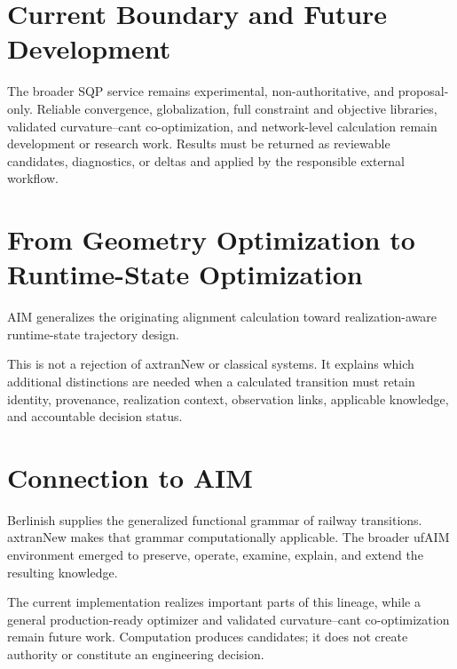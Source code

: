 \section{Current Boundary and Future Development}

The broader SQP service remains experimental, non-authoritative, and
proposal-only. Reliable convergence, globalization, full constraint and
objective libraries, validated curvature--cant co-optimization, and
network-level calculation remain development or research work. Results must be
returned as reviewable candidates, diagnostics, or deltas and applied by the
responsible external workflow.

\section{From Geometry Optimization to Runtime-State Optimization}

AIM generalizes the originating alignment calculation toward
realization-aware runtime-state trajectory design.

This is not a rejection of axtranNew or classical systems. It explains which
additional distinctions are needed when a calculated transition must retain
identity, provenance, realization context, observation links, applicable
knowledge, and accountable decision status.

\section{Connection to AIM}

\begin{summary}
Berlinish supplies the generalized functional grammar of railway transitions.
axtranNew makes that grammar computationally applicable. The broader ufAIM
environment emerged to preserve, operate, examine, explain, and extend the
resulting knowledge.

The current implementation realizes important parts of this lineage, while a
general production-ready optimizer and validated curvature--cant
co-optimization remain future work. Computation produces candidates; it does
not create authority or constitute an engineering decision.
\end{summary}
